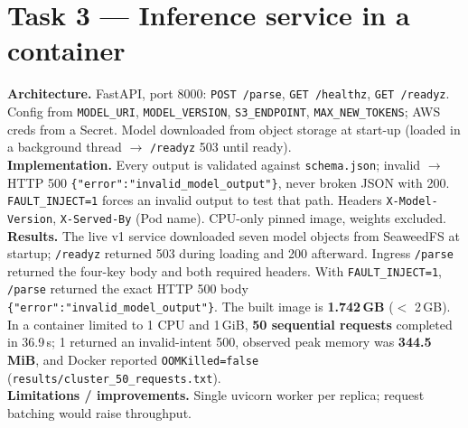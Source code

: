 \documentclass[10pt,a4paper]{article}
\newcommand{\code}[1]{\texttt{\small #1}}
\begin{document}
\section{Task 3 --- Inference service in a container}
\textbf{Architecture.} FastAPI, port 8000: \code{POST /parse}, \code{GET /healthz}, \code{GET /readyz}.
Config from \code{MODEL\_URI}, \code{MODEL\_VERSION}, \code{S3\_ENDPOINT}, \code{MAX\_NEW\_TOKENS}; AWS creds
from a Secret. Model downloaded from object storage at start-up (loaded in a background thread
$\rightarrow$ \code{/readyz} 503 until ready).\\
\textbf{Implementation.} Every output is validated against \code{schema.json}; invalid $\rightarrow$ HTTP 500
\code{\{"error":"invalid\_model\_output"\}}, never broken JSON with 200. \code{FAULT\_INJECT=1} forces an
invalid output to test that path. Headers \code{X-Model-Version}, \code{X-Served-By} (Pod name). CPU-only
pinned image, weights excluded.\\
\textbf{Results.} The live v1 service downloaded seven model objects from SeaweedFS at startup;
\code{/readyz} returned 503 during loading and 200 afterward. Ingress \code{/parse} returned the
four-key body and both required headers. With \code{FAULT\_INJECT=1}, \code{/parse} returned the exact
HTTP 500 body \code{\{"error":"invalid\_model\_output"\}}. The built image is
\textbf{1.742\,GB} ($<$ 2\,GB). In a container limited to 1 CPU and 1\,GiB,
\textbf{50 sequential requests} completed in 36.9\,s; 1 returned an invalid-intent 500, observed peak
memory was \textbf{344.5\,MiB}, and Docker reported \code{OOMKilled=false}
(\code{results/cluster\_50\_requests.txt}).\\
\textbf{Limitations / improvements.} Single uvicorn worker per replica; request batching would raise
throughput.
\end{document}
